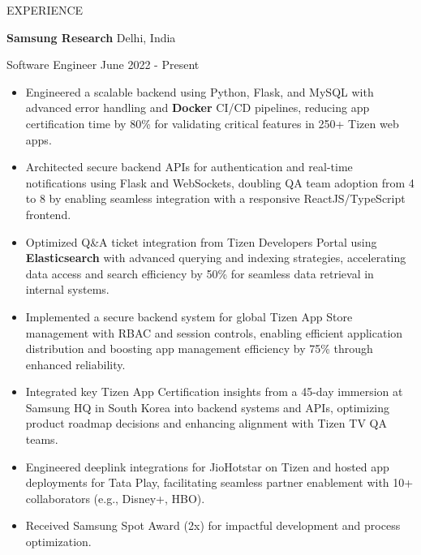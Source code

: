 \documentclass{resume} %
\begin{document}
\begin{rSection}{EXPERIENCE}


\textbf{Samsung Research} \hfill Delhi, India

Software Engineer \hfill June 2022 - Present


 \begin{itemize}

    \itemsep -1pt {}


    \item Engineered a scalable backend using Python, Flask, and MySQL 
with advanced error handling and \textbf{Docker} CI/CD pipelines, reducing app 
certification time by 80\% for validating critical features in 250+ 
Tizen web apps.

    \item Architected secure backend APIs for 
authentication and real-time notifications using Flask and WebSockets, 
doubling QA team adoption from 4 to 8 by enabling seamless integration 
with a responsive ReactJS/TypeScript frontend.

    \item 
Optimized Q\&A ticket integration from Tizen Developers Portal using
 \textbf{Elasticsearch} with advanced querying and indexing strategies, 
accelerating data access and search efficiency by 50\% for seamless data
 retrieval in internal systems.

    \item Implemented a secure 
backend system for global Tizen App Store management with RBAC and 
session controls, enabling efficient application distribution and 
boosting app management efficiency by 75\% through enhanced reliability.


    \item Integrated key Tizen App Certification insights from a 45-day 
immersion at Samsung HQ in South Korea into backend systems and APIs, 
optimizing product roadmap decisions and enhancing alignment with Tizen 
TV QA teams.

    \item Engineered deeplink integrations for 
JioHotstar on Tizen and hosted app deployments for Tata Play, 
facilitating seamless partner enablement with 10+ collaborators (e.g., 
Disney+, HBO).

    \item Received Samsung Spot Award (2x) for impactful development and process optimization.


 \end{itemize}


\end{rSection}
\end{document}
